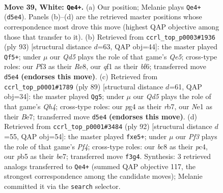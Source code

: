 \documentclass[11pt]{article}
\begin{document}
\clearpage

\begin{figure}[p]\centering
\begin{subfigure}{0.46\textwidth}\centering
\resizebox{\linewidth}{!}{%
\newchessgame
\chessboard[
  setfen={n1b4r/8/6k1/1p1Q4/6pp/P2P1P2/7K/4Nq2 w - - 8 39},
  showmover=false,
  pgfstyle=straightmove, color=movearrow, markmove={d5-e4}
]}
\caption{}
\end{subfigure}\hfill
\begin{subfigure}{0.46\textwidth}\centering
\resizebox{\linewidth}{!}{%
\newchessgame
\chessboard[
  setfen={4r1k1/5pn1/5BpQ/p3P3/P3q3/1N6/5K2/8 b - - 11 47},
  showmover=false,
  pgfstyle=straightmove, color=movearrow, markmove={e4-f5}
]}
\caption{}
\end{subfigure}
\\[4pt]
\begin{subfigure}{0.46\textwidth}\centering
\resizebox{\linewidth}{!}{%
\newchessgame
\chessboard[
  setfen={7k/1R2b3/4Q2p/4p2q/4B3/p4PP1/3r3P/5K2 b - - 5 45},
  showmover=false,
  pgfstyle=straightmove, color=movearrow, markmove={h5-g5}
]}
\caption{}
\end{subfigure}\hfill
\begin{subfigure}{0.46\textwidth}\centering
\resizebox{\linewidth}{!}{%
\newchessgame
\chessboard[
  setfen={8/4b2p/5k2/4p3/2p2P1P/5q2/3Q1PNK/8 w - - 0 47},
  showmover=false,
  pgfstyle=straightmove, color=movearrow, markmove={f4-e5}
]}
\caption{}
\end{subfigure}
\caption{\textbf{Move 39, White: \texttt{Qe4+}.} (a) Our position; Melanie plays \texttt{Qe4+} (\texttt{d5e4}). Panels (b)--(d) are the retrieved master positions whose correspondence most drove this move (highest QAP objective among those that transfer to it). (b) Retrieved from \texttt{ccrl\_top\_p0003\#1936} (ply 93) [structural distance $d$=63, QAP obj=44]: the master played \texttt{Qf5+}; under $\mu$ our \emph{Qd5} plays the role of that game's \emph{Qe5}; cross-type roles: our \emph{P}f3 as their \emph{R}e8, our \emph{q}f1 as their \emph{b}f6; transferred move \texttt{d5e4} \textbf{(endorses this move)}. (c) Retrieved from \texttt{ccrl\_top\_p0001\#1789} (ply 89) [structural distance $d$=61, QAP obj=34]: the master played \texttt{Qg5}; under $\mu$ our \emph{Qd5} plays the role of that game's \emph{Qh4}; cross-type roles: our \emph{p}g4 as their \emph{r}b7, our \emph{N}e1 as their \emph{B}e7; transferred move \texttt{d5e4} \textbf{(endorses this move)}. (d) Retrieved from \texttt{ccrl\_top\_p0001\#3484} (ply 92) [structural distance $d$=55, QAP obj=54]: the master played \texttt{fxe5+}; under $\mu$ our \emph{Pf3} plays the role of that game's \emph{Pf4}; cross-type roles: our \emph{b}c8 as their \emph{p}c4, our \emph{p}b5 as their \emph{b}e7; transferred move \texttt{f3g4}. Synthesis: 3 retrieved analogs transferred to \texttt{Qe4+} (summed QAP objective 117, the strongest correspondence among the candidate moves); Melanie committed it via the \texttt{search} selector.}
\label{fig:thought-m76}
\end{figure}
\end{document}
